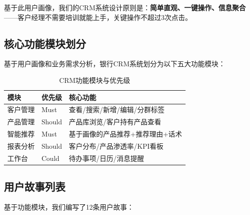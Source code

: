 基于此用户画像，我们的CRM系统设计原则是：\textbf{简单直观、一键操作、信息聚合}——客户经理不需要培训就能上手，关键操作不超过3次点击。

\subsection{核心功能模块划分}

基于用户画像和业务需求分析，银行CRM系统划分为以下五大功能模块：

\begin{table}[H]
\centering
\small
\begin{tabular}{llp{6cm}}
\toprule
\textbf{模块} & \textbf{优先级} & \textbf{核心功能} \\
\midrule
客户管理 & Must & 查看/搜索/新增/编辑/分群标签 \\
产品管理 & Should & 产品库浏览/客户持有产品查看 \\
智能推荐 & Must & 基于画像的产品推荐+推荐理由+话术 \\
报表分析 & Should & 客户分布/产品渗透率/KPI看板 \\
工作台 & Could & 待办事项/日历/消息提醒 \\
\bottomrule
\end{tabular}
\caption{CRM功能模块与优先级}
\end{table}

\subsection{用户故事列表}

基于功能模块，我们编写了12条用户故事：

